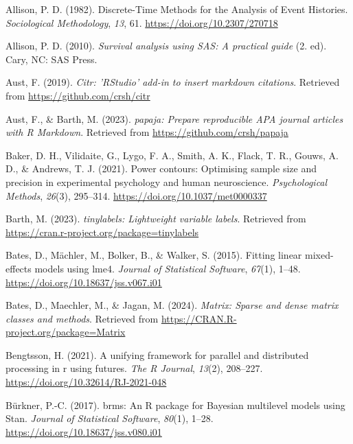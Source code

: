 \documentclass[
  man,floatsintext]{apa6}
\newlength{\cslhangindent}
\newenvironment{CSLReferences}[2] %
 {\begin{list}{}{%
  \setlength{\itemindent}{0pt}
  \setlength{\leftmargin}{0pt}
  \setlength{\parsep}{0pt}
  \ifodd #1
   \setlength{\leftmargin}{\cslhangindent}
   \setlength{\itemindent}{-1\cslhangindent}
  \fi
  \setlength{\itemsep}{#2\baselineskip}}}
 {\end{list}}
\begin{document}
\label{refs}
\begin{CSLReferences}{1}{0}
Allison, P. D. (1982). Discrete-{Time Methods} for the {Analysis} of {Event Histories}. \emph{Sociological Methodology}, \emph{13}, 61. \url{https://doi.org/10.2307/270718}

Allison, P. D. (2010). \emph{Survival analysis using {SAS}: A practical guide} (2. ed). Cary, NC: SAS Press.

Aust, F. (2019). \emph{Citr: 'RStudio' add-in to insert markdown citations}. Retrieved from \url{https://github.com/crsh/citr}

Aust, F., \& Barth, M. (2023). \emph{{papaja}: {Prepare} reproducible {APA} journal articles with {R Markdown}}. Retrieved from \url{https://github.com/crsh/papaja}

Baker, D. H., Vilidaite, G., Lygo, F. A., Smith, A. K., Flack, T. R., Gouws, A. D., \& Andrews, T. J. (2021). Power contours: {Optimising} sample size and precision in experimental psychology and human neuroscience. \emph{Psychological Methods}, \emph{26}(3), 295--314. \url{https://doi.org/10.1037/met0000337}

Barth, M. (2023). \emph{{tinylabels}: Lightweight variable labels}. Retrieved from \url{https://cran.r-project.org/package=tinylabels}

Bates, D., Mächler, M., Bolker, B., \& Walker, S. (2015). Fitting linear mixed-effects models using {lme4}. \emph{Journal of Statistical Software}, \emph{67}(1), 1--48. \url{https://doi.org/10.18637/jss.v067.i01}

Bates, D., Maechler, M., \& Jagan, M. (2024). \emph{Matrix: Sparse and dense matrix classes and methods}. Retrieved from \url{https://CRAN.R-project.org/package=Matrix}

Bengtsson, H. (2021). A unifying framework for parallel and distributed processing in r using futures. \emph{The R Journal}, \emph{13}(2), 208--227. \url{https://doi.org/10.32614/RJ-2021-048}

Bürkner, P.-C. (2017). {brms}: An {R} package for {Bayesian} multilevel models using {Stan}. \emph{Journal of Statistical Software}, \emph{80}(1), 1--28. \url{https://doi.org/10.18637/jss.v080.i01}


\end{CSLReferences}
\end{document}
